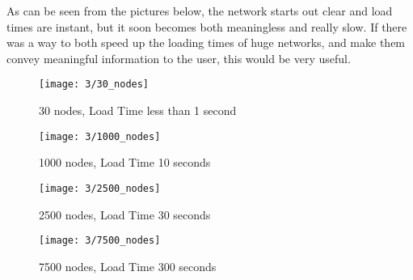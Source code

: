 \documentclass[../dissertation.tex]{subfiles}
\begin{document}
As can be seen from the pictures below, the network starts out clear and load times are instant, but it soon becomes both meaningless and really slow. If there was a way to both speed up the loading times of huge networks, and make them convey meaningful information to the user, this would be very useful.

\begin{figure}
    \centering
    \texttt{[image: 3/30\_nodes]}
    \caption{30 nodes, Load Time less than 1 second}
\end{figure}

\begin{figure}
    \centering
    \texttt{[image: 3/1000\_nodes]}
    \caption{1000 nodes, Load Time 10 seconds}
\end{figure}

\begin{figure}
    \centering
    \texttt{[image: 3/2500\_nodes]}
    \caption{2500 nodes, Load Time 30 seconds}
\end{figure}

\begin{figure}
    \centering
    \texttt{[image: 3/7500\_nodes]}
    \caption{7500 nodes, Load Time 300 seconds}
\end{figure}
\end{document}
